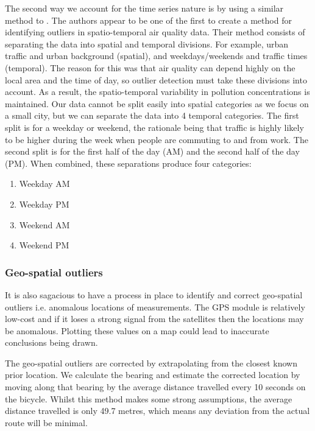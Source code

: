 \documentclass[11pt]{report}
\begin{document}
The second way we account for the time series nature is by using a similar method to \cite{vanZoest2018outlierdetection}. The authors appear to be one of the first to create a method for identifying outliers in spatio-temporal air quality data. Their method consists of separating the data into spatial and temporal divisions. For example, urban traffic and urban background (spatial), and weekdays/weekends and traffic times (temporal). The reason for this was that air quality can depend highly on the local area and the time of day, so outlier detection must take these divisions into account. As a result, the spatio-temporal variability in pollution concentrations is maintained. Our data cannot be split easily into spatial categories as we focus on a small city, but we can separate the data into 4 temporal categories. The first split is for a weekday or weekend, the rationale being that traffic is highly likely to be higher during the week when people are commuting to and from work. The second split is for the first half of the day (AM) and the second half of the day (PM). When combined, these separations produce four categories:
\begin{enumerate}
\item Weekday AM
\item Weekday PM
\item Weekend AM
\item Weekend PM
\end{enumerate}



\subsubsection{Geo-spatial outliers} \label{gps_outliers}

It is also sagacious to have a process in place to identify and correct geo-spatial outliers i.e. anomalous locations of measurements. The GPS module is relatively low-cost and if it loses a strong signal from the satellites then the locations may be anomalous. Plotting these values on a map could lead to inaccurate conclusions being drawn.

The geo-spatial outliers are corrected by extrapolating from the closest known prior location. We calculate the bearing and estimate the corrected location by moving along that bearing by the average distance travelled every 10 seconds on the bicycle. Whilst this method makes some strong assumptions, the average distance travelled is only 49.7 metres, which means any deviation from the actual route will be minimal.
\end{document}
